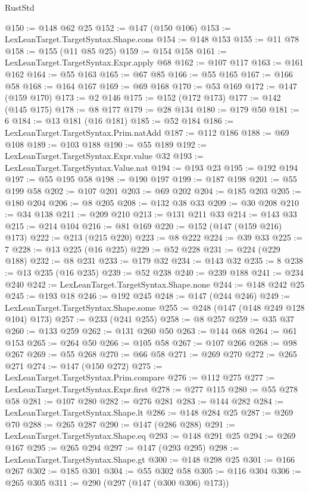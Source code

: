 \begin{lexlean}{RustStd}
\begin{coremodule}
@150 := @148 @62 @25
@152 := @147 (@150 @106)
@153 := LexLeanTarget.TargetSyntax.Shape.cons
@154 := @148 @153
@155 := @11 @78
@158 := @155 (@11 @85 @25)
@159 := @154 @158
@161 := LexLeanTarget.TargetSyntax.Expr.apply @68
@162 := @107 @117
@163 := @161 @162
@164 := @55 @163
@165 := @67 @85
@166 := @55 @165
@167 := @166 @58
@168 := @164 @167
@169 := @69 @168
@170 := @53 @169
@172 := @147 (@159 @170)
@173 := @2 @146
@175 := @152 (@172 @173)
@177 := @142 (@145 @175)
@178 := @8 @177
@179 := @28 @134
@180 := @179 @50
@181 := 6
@184 := @13 @181 (@16 @181)
@185 := @52 @184
@186 := LexLeanTarget.TargetSyntax.Prim.natAdd
@187 := @112 @186
@188 := @69 @108
@189 := @103 @188
@190 := @55 @189
@192 := LexLeanTarget.TargetSyntax.Expr.value @32
@193 := LexLeanTarget.TargetSyntax.Value.nat
@194 := @193 @23
@195 := @192 @194
@197 := @55 @195 @58
@198 := @190 @197
@199 := @187 @198
@201 := @55 @199 @58
@202 := @107 @201
@203 := @69 @202
@204 := @185 @203
@205 := @180 @204
@206 := @8 @205
@208 := @132 @38 @33
@209 := @30 @208
@210 := @34 @138
@211 := @209 @210
@213 := @131 @211 @33
@214 := @143 @33
@215 := @214 @104
@216 := @81 @169
@220 := @152 (@147 (@159 @216) @173)
@222 := @213 (@215 @220)
@223 := @8 @222
@224 := @39 @33
@225 := 7
@228 := @13 @225 (@16 @225)
@229 := @52 @228
@231 := @224 (@229 @188)
@232 := @8 @231
@233 := @179 @32
@234 := @143 @32
@235 := 8
@238 := @13 @235 (@16 @235)
@239 := @52 @238
@240 := @239 @188
@241 := @234 @240
@242 := LexLeanTarget.TargetSyntax.Shape.none
@244 := @148 @242 @25
@245 := @193 @18
@246 := @192 @245
@248 := @147 (@244 @246)
@249 := LexLeanTarget.TargetSyntax.Shape.some
@255 := @248 (@147 (@148 @249 @128 @104) @173)
@257 := @233 (@241 @255)
@258 := @8 @257
@259 := @35 @37
@260 := @133 @259
@262 := @131 @260 @50
@263 := @144 @68
@264 := @61 @153
@265 := @264 @50
@266 := @105 @58
@267 := @107 @266
@268 := @98 @267
@269 := @55 @268
@270 := @66 @58
@271 := @269 @270
@272 := @265 @271
@274 := @147 (@150 @272)
@275 := LexLeanTarget.TargetSyntax.Prim.compare
@276 := @112 @275
@277 := LexLeanTarget.TargetSyntax.Expr.first
@278 := @277 @115
@280 := @55 @278 @58
@281 := @107 @280
@282 := @276 @281
@283 := @144 @282
@284 := LexLeanTarget.TargetSyntax.Shape.lt
@286 := @148 @284 @25
@287 := @269 @70
@288 := @265 @287
@290 := @147 (@286 @288)
@291 := LexLeanTarget.TargetSyntax.Shape.eq
@293 := @148 @291 @25
@294 := @269 @167
@295 := @265 @294
@297 := @147 (@293 @295)
@298 := LexLeanTarget.TargetSyntax.Shape.gt
@300 := @148 @298 @25
@301 := @166 @267
@302 := @185 @301
@304 := @55 @302 @58
@305 := @116 @304
@306 := @265 @305
@311 := @290 (@297 (@147 (@300 @306) @173))

\end{coremodule}
\end{lexlean}
